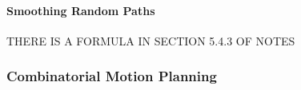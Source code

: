 			\paragraph{Smoothing Random Paths}%
			\label{sec:smoothing_random_paths}

				THERE IS A FORMULA IN SECTION 5.4.3 OF NOTES

		\subsubsection{Combinatorial Motion Planning}%
		\label{sec:combinatorial_motion_planning}
